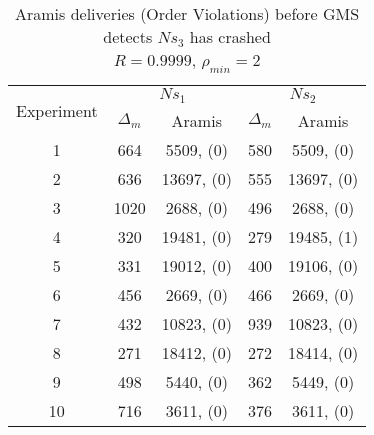 \begin{table}[p]
    \begin{center}
        \renewcommand{\arraystretch}{1.25}
        \begin{tabular}{|c|c|c|c|c|}
            \hline
            \multirow{2}{*}{Experiment} & \multicolumn{2}{|c|}{$Ns_1$} & \multicolumn{2}{|c|}{$Ns_2$} \\ \cline{2-5}
                                                       & $\Delta_m$&\textsf{Aramis} & $\Delta_m$&\textsf{Aramis} \\ \hline \hline
            1 & 664 & 5509, (0) & 580 & 5509, (0) \\ \hline
            2 & 636 & 13697, (0) & 555 & 13697, (0) \\ \hline
            3 & 1020 & 2688, (0) & 496 & 2688, (0) \\ \hline
            4 & 320 & 19481, (0) & 279 & 19485, (1) \\ \hline
            5 & 331 & 19012, (0) & 400 & 19106, (0) \\ \hline
            6 & 456 & 2669, (0) & 466 & 2669, (0) \\ \hline
            7 & 432 & 10823, (0) & 939 & 10823, (0) \\ \hline
            8 & 271 & 18412, (0) & 272 & 18414, (0) \\ \hline
            9 & 498 & 5440, (0) & 362 & 5449, (0) \\ \hline
            10 & 716 & 3611, (0) & 376 & 3611, (0) \\ \hline
        \end{tabular}
        \caption[\textsf{Aramis} deliveries before GMS detects node crash ($R=0.9999$, $\rho_{min}=2$)]{\textsf{Aramis} deliveries (Order Violations) before GMS detects $Ns_3$ has crashed \\ $R=0.9999$, $\rho_{min}=2$}
        \label{table:crashed_node_rho2}
    \end{center}
\end{table}

